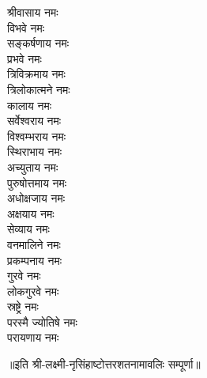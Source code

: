 \begin{multicols}{2}
\begin{flushleft}
श्रीवासाय नमः\\
विभवे नमः\\
सङ्कर्षणाय नमः\\
प्रभवे नमः\hfill{}\\
त्रिविक्रमाय नमः\\
त्रिलोकात्मने नमः\\
कालाय नमः\\
सर्वेश्वराय नमः\\
विश्वम्भराय नमः\\
स्थिराभाय नमः\\
अच्युताय नमः\\
पुरुषोत्तमाय नमः\\
अधोक्षजाय नमः\\
अक्षयाय नमः\hfill{}\\
सेव्याय नमः\\
वनमालिने नमः\\
प्रकम्पनाय नमः\\
गुरवे नमः\\
लोकगुरवे नमः\\
स्रष्ट्रे नमः\\
परस्मै ज्योतिषे नमः\\
परायणाय नमः\hfill{}\\
\end{flushleft}
\end{multicols}
॥इति श्री-लक्ष्मी-नृसिंहाष्टोत्तरशतनामावलिः सम्पूर्णा॥
